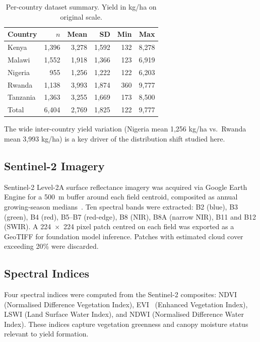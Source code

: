 \documentclass[journal]{IEEEtran}
\begin{document}
\begin{table}[!t]
  \centering
  \caption{Per-country dataset summary. Yield in kg/ha on original scale.}
  \label{tab:dataset}
  \begin{tabular}{lrrrrr}
    \toprule
    Country   & $n$ & Mean & SD   & Min  & Max    \\
    \midrule
    Kenya     & 1{,}396 & 3{,}278 & 1{,}592 & 132  & 8{,}278  \\
    Malawi    & 1{,}552 & 1{,}918 & 1{,}366 & 123  & 6{,}919  \\
    Nigeria   & 955     & 1{,}256 & 1{,}222 & 122  & 6{,}203  \\
    Rwanda    & 1{,}138 & 3{,}993 & 1{,}874 & 360  & 9{,}777  \\
    Tanzania  & 1{,}363 & 3{,}255 & 1{,}669 & 173  & 8{,}500  \\
    \midrule
    Total     & 6{,}404 & 2{,}769 & 1{,}825 & 122  & 9{,}777  \\
    \bottomrule
  \end{tabular}
\end{table}

The wide inter-country yield variation (Nigeria mean 1{,}256 kg/ha vs.\
Rwanda mean 3{,}993 kg/ha) is a key driver of the distribution shift studied here.

\subsection{Sentinel-2 Imagery}

Sentinel-2 Level-2A surface reflectance imagery was acquired via Google Earth Engine
for a 500~m buffer around each field centroid, composited as annual growing-season
medians~\cite{drusch2012sentinel2}.
Ten spectral bands were extracted: B2 (blue), B3 (green), B4 (red),
B5--B7 (red-edge), B8 (NIR), B8A (narrow NIR), B11 and B12 (SWIR).
A 224~$\times$~224 pixel patch centred on each field was exported as a
GeoTIFF for foundation model inference.
Patches with estimated cloud cover exceeding 20\% were discarded.

\subsection{Spectral Indices}

Four spectral indices were computed from the Sentinel-2 composites:
NDVI~\cite{rouse1974ndvi} (Normalised Difference Vegetation Index),
EVI~\cite{jiang2008evi} (Enhanced Vegetation Index),
LSWI (Land Surface Water Index), and NDWI (Normalised Difference Water Index).
These indices capture vegetation greenness and canopy moisture status
relevant to yield formation.
\end{document}
